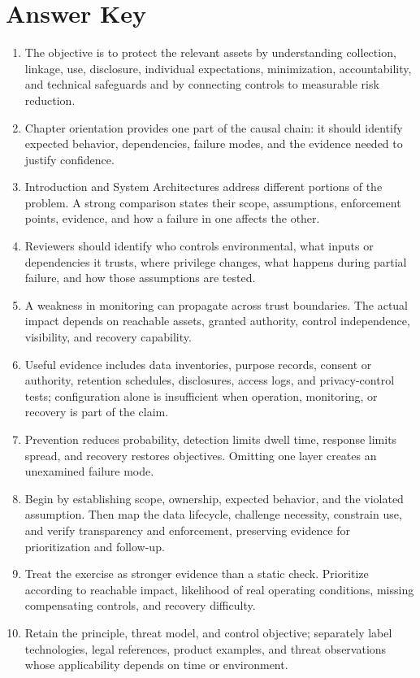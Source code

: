 \documentclass[11pt,letterpaper]{article}
\begin{document}
\section*{Answer Key}
\begin{enumerate}
\item The objective is to protect the relevant assets by understanding collection, linkage, use, disclosure, individual expectations, minimization, accountability, and technical safeguards and by connecting controls to measurable risk reduction.
\item Chapter orientation provides one part of the causal chain: it should identify expected behavior, dependencies, failure modes, and the evidence needed to justify confidence.
\item Introduction and System Architectures address different portions of the problem. A strong comparison states their scope, assumptions, enforcement points, evidence, and how a failure in one affects the other.
\item Reviewers should identify who controls environmental, what inputs or dependencies it trusts, where privilege changes, what happens during partial failure, and how those assumptions are tested.
\item A weakness in monitoring can propagate across trust boundaries. The actual impact depends on reachable assets, granted authority, control independence, visibility, and recovery capability.
\item Useful evidence includes data inventories, purpose records, consent or authority, retention schedules, disclosures, access logs, and privacy-control tests; configuration alone is insufficient when operation, monitoring, or recovery is part of the claim.
\item Prevention reduces probability, detection limits dwell time, response limits spread, and recovery restores objectives. Omitting one layer creates an unexamined failure mode.
\item Begin by establishing scope, ownership, expected behavior, and the violated assumption. Then map the data lifecycle, challenge necessity, constrain use, and verify transparency and enforcement, preserving evidence for prioritization and follow-up.
\item Treat the exercise as stronger evidence than a static check. Prioritize according to reachable impact, likelihood of real operating conditions, missing compensating controls, and recovery difficulty.
\item Retain the principle, threat model, and control objective; separately label technologies, legal references, product examples, and threat observations whose applicability depends on time or environment.
\end{enumerate}
\end{document}
